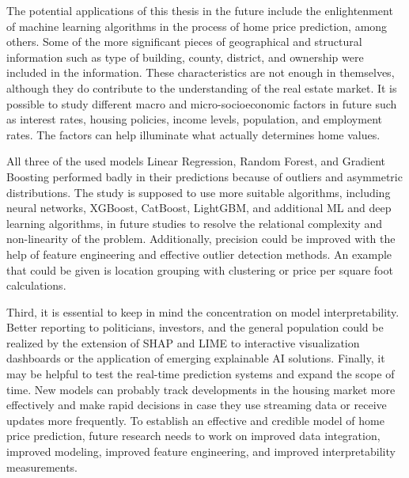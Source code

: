 \documentclass[12pt, a4paper, oneside]{book}
\begin{document}
The potential applications of this thesis in the future include the enlightenment of machine learning algorithms in the process of home price prediction, among others. Some of the more significant pieces of geographical and structural information such as type of building, county, district, and ownership were included in the information. These characteristics are not enough in themselves, although they do contribute to the understanding of the real estate market. It is possible to study different macro and micro-socioeconomic factors in future such as interest rates, housing policies, income levels, population, and employment rates. The factors can help illuminate what actually determines home values.


All three of the used models Linear Regression, Random Forest, and Gradient Boosting performed badly in their predictions because of outliers and asymmetric distributions. The study is supposed to use more suitable algorithms, including neural networks, XGBoost, CatBoost, LightGBM, and additional ML and deep learning algorithms, in future studies to resolve the relational complexity and non-linearity of the problem. Additionally, precision could be improved with the help of feature engineering and effective outlier detection methods. An example that could be given is location grouping with clustering or price per square foot calculations.


Third, it is essential to keep in mind the concentration on model interpretability. Better reporting to politicians, investors, and the general population could be realized by the extension of SHAP and LIME to interactive visualization dashboards or the application of emerging explainable AI solutions. Finally, it may be helpful to test the real-time prediction systems and expand the scope of time. New models can probably track developments in the housing market more effectively and make rapid decisions in case they use streaming data or receive updates more frequently. To establish an effective and credible model of home price prediction, future research needs to work on improved data integration, improved modeling, improved feature engineering, and improved interpretability measurements.
\end{document}
